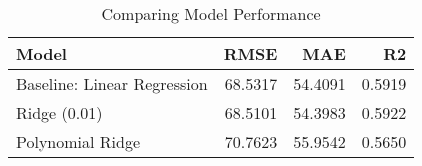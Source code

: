 \begin{table}
\centering
\caption{Comparing Model Performance}
\begin{tabular}{lrrr}
\toprule
                      Model &    RMSE &     MAE &     R2 \\
\midrule
Baseline: Linear Regression & 68.5317 & 54.4091 & 0.5919 \\
               Ridge (0.01) & 68.5101 & 54.3983 & 0.5922 \\
           Polynomial Ridge & 70.7623 & 55.9542 & 0.5650 \\
\bottomrule
\end{tabular}
\end{table}
